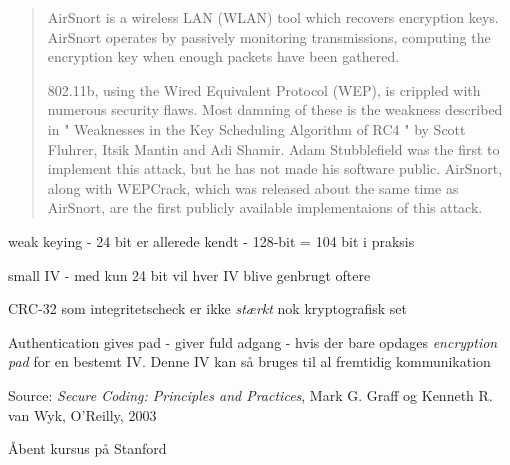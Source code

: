 \documentclass[Screen16to9,17pt]{foils}
\begin{document}
\begin{quote}
AirSnort is a wireless LAN (WLAN) tool which recovers encryption
keys. AirSnort operates by passively monitoring transmissions,
computing the encryption key when enough packets have been gathered.

802.11b, using the Wired Equivalent Protocol (WEP), is crippled with
numerous security flaws. Most damning of these is the weakness
described in " Weaknesses in the Key Scheduling Algorithm of RC4 "
by Scott Fluhrer, Itsik Mantin and Adi Shamir. Adam Stubblefield
was the first to implement this attack, but he has not made his
software public. AirSnort, along with WEPCrack, which was released
about the same time as AirSnort, are the first publicly available
implementaions of this attack.  
\end{quote}



\begin{list1}
\item weak keying - 24 bit er allerede kendt - 128-bit = 104 bit i praksis
\item small IV - med kun 24 bit vil hver IV blive genbrugt oftere
\item CRC-32 som integritetscheck er ikke \emph{stærkt} nok
  kryptografisk set
\item Authentication gives pad - giver fuld adgang - hvis der bare
  opdages \emph{encryption pad} for en bestemt IV. Denne IV kan så
  bruges til al fremtidig kommunikation
\end{list1}
Source:
\emph{Secure Coding: Principles and Practices}, Mark G. Graff
  og Kenneth R. van Wyk, O'Reilly, 2003



Åbent kursus på Stanford\\



\end{document}
